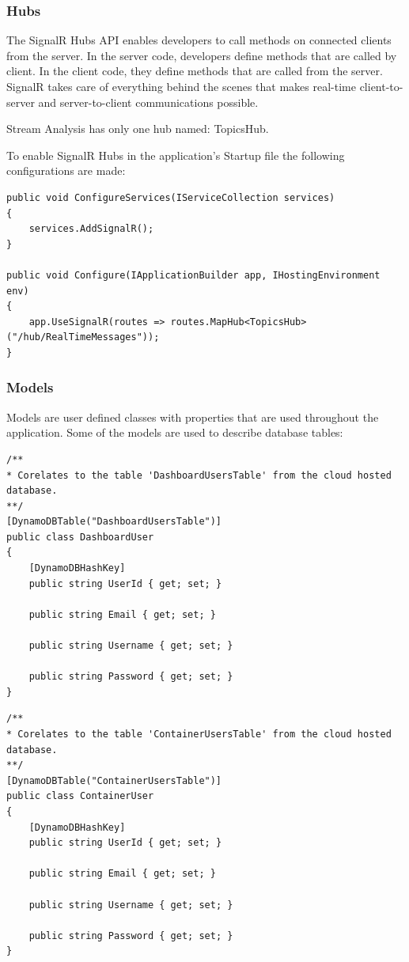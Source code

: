 \subsubsection{Hubs}
\label{chap:04:02:03:03}
The SignalR Hubs API enables developers to call methods on connected clients from the server. In the server code, developers define methods that are called by client. In the client code, they define methods that are called from the server. SignalR takes care of everything behind the scenes that makes real-time client-to-server and server-to-client communications possible.

Stream Analysis has only one hub named: TopicsHub.

To enable SignalR Hubs in the application's Startup file the following configurations are made:

\begin{lstlisting}
public void ConfigureServices(IServiceCollection services)
{
	services.AddSignalR();
}

public void Configure(IApplicationBuilder app, IHostingEnvironment env)
{
	app.UseSignalR(routes => routes.MapHub<TopicsHub>("/hub/RealTimeMessages"));
}
\end{lstlisting}

\subsubsection{Models}
\label{chap:04:02:03:04}
Models are user defined classes with properties that are used throughout the application. Some of the models are used to describe database tables:

\begin{lstlisting}
/**
* Corelates to the table 'DashboardUsersTable' from the cloud hosted database.
**/
[DynamoDBTable("DashboardUsersTable")]
public class DashboardUser
{
	[DynamoDBHashKey]
	public string UserId { get; set; }
	
	public string Email { get; set; }
	
	public string Username { get; set; }
	
	public string Password { get; set; }
}
\end{lstlisting}

\begin{lstlisting}
/**
* Corelates to the table 'ContainerUsersTable' from the cloud hosted database.
**/
[DynamoDBTable("ContainerUsersTable")]
public class ContainerUser
{
	[DynamoDBHashKey]
	public string UserId { get; set; }
	
	public string Email { get; set; }
	
	public string Username { get; set; }
	
	public string Password { get; set; }
}
\end{lstlisting}

